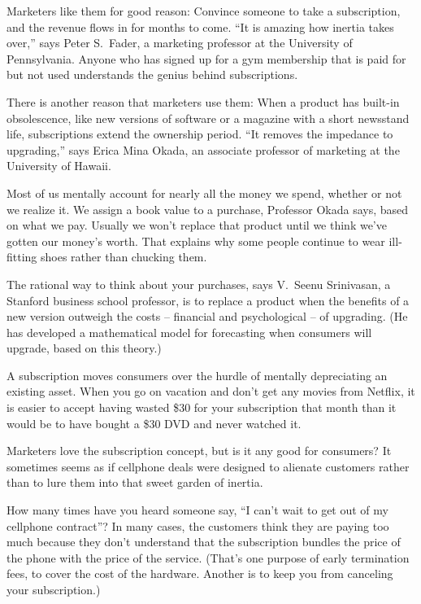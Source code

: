 ﻿\documentclass[12pt]{article}
\begin{document}
Marketers like them for good reason: Convince someone to take a subscription, and the revenue flows
in for months to come. ``It is amazing how inertia takes over,'' says Peter S.~Fader, a marketing
professor at the University of Pennsylvania. Anyone who has signed up for a gym membership that is
paid for but not used understands the genius behind subscriptions.

There is another reason that marketers use them: When a product has built-in obsolescence, like new
versions of software or a magazine with a short newsstand life, subscriptions extend the ownership
period. ``It removes the impedance to upgrading,'' says Erica Mina Okada, an associate professor of
marketing at the University of Hawaii.

Most of us mentally account for nearly all the money we spend, whether or not we realize it. We
assign a book value to a purchase, Professor Okada says, based on what we pay. Usually we won't
replace that product until we think we've gotten our money's worth. That explains why some people
continue to wear ill-fitting shoes rather than chucking them.

The rational way to think about your purchases, says V.~Seenu Srinivasan, a Stanford business school
professor, is to replace a product when the benefits of a new version outweigh the costs --
financial and psychological -- of upgrading. (He has developed a mathematical model for forecasting
when consumers will upgrade, based on this theory.)

A subscription moves consumers over the hurdle of mentally depreciating an existing asset. When you
go on vacation and don't get any movies from Netflix, it is easier to accept having wasted \$30 for
your subscription that month than it would be to have bought a \$30 DVD and never watched it.

Marketers love the subscription concept, but is it any good for consumers? It sometimes seems as if
cellphone deals were designed to alienate customers rather than to lure them into that sweet garden
of inertia.

How many times have you heard someone say, ``I can't wait to get out of my cellphone contract''? In
many cases, the customers think they are paying too much because they don't understand that the
subscription bundles the price of the phone with the price of the service. (That's one purpose of
early termination fees, to cover the cost of the hardware. Another is to keep you from canceling
your subscription.)
\end{document}
